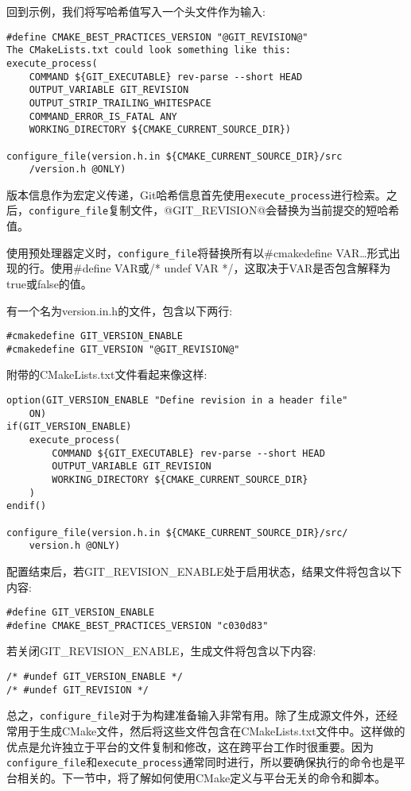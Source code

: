 回到示例，我们将写哈希值写入一个头文件作为输入:

\begin{lstlisting}[style=styleCMake]
#define CMAKE_BEST_PRACTICES_VERSION "@GIT_REVISION@"
The CMakeLists.txt could look something like this:
execute_process(
	COMMAND ${GIT_EXECUTABLE} rev-parse --short HEAD
	OUTPUT_VARIABLE GIT_REVISION
	OUTPUT_STRIP_TRAILING_WHITESPACE
	COMMAND_ERROR_IS_FATAL ANY
	WORKING_DIRECTORY ${CMAKE_CURRENT_SOURCE_DIR})

configure_file(version.h.in ${CMAKE_CURRENT_SOURCE_DIR}/src
	/version.h @ONLY)
\end{lstlisting}

版本信息作为宏定义传递，Git哈希信息首先使用\texttt{execute\_process}进行检索。之后，\texttt{configure\_file}复制文件，@GIT\_REVISION@会替换为当前提交的短哈希值。

使用预处理器定义时，\texttt{configure\_file}将替换所有以\#cmakedefine VAR…形式出现的行。使用\#define VAR或/* undef VAR */，这取决于VAR是否包含解释为true或false的值。

有一个名为version.in.h的文件，包含以下两行:

\begin{lstlisting}[style=styleCMake]
#cmakedefine GIT_VERSION_ENABLE
#cmakedefine GIT_VERSION "@GIT_REVISION@"
\end{lstlisting}

附带的CMakeLists.txt文件看起来像这样:

\begin{lstlisting}[style=styleCMake]
option(GIT_VERSION_ENABLE "Define revision in a header file"
	ON)
if(GIT_VERSION_ENABLE)
	execute_process(
		COMMAND ${GIT_EXECUTABLE} rev-parse --short HEAD
		OUTPUT_VARIABLE GIT_REVISION
		WORKING_DIRECTORY ${CMAKE_CURRENT_SOURCE_DIR}
	)
endif()

configure_file(version.h.in ${CMAKE_CURRENT_SOURCE_DIR}/src/
	version.h @ONLY)
\end{lstlisting}

配置结束后，若GIT\_REVISION\_ENABLE处于启用状态，结果文件将包含以下内容:

\begin{lstlisting}[style=styleCXX]
#define GIT_VERSION_ENABLE
#define CMAKE_BEST_PRACTICES_VERSION "c030d83"
\end{lstlisting}

若关闭GIT\_REVISION\_ENABLE，生成文件将包含以下内容:

\begin{lstlisting}[style=styleCXX]
/* #undef GIT_VERSION_ENABLE */
/* #undef GIT_REVISION */
\end{lstlisting}

总之，\texttt{configure\_file}对于为构建准备输入非常有用。除了生成源文件外，还经常用于生成CMake文件，然后将这些文件包含在CMakeLists.txt文件中。这样做的优点是允许独立于平台的文件复制和修改，这在跨平台工作时很重要。因为\texttt{configure\_file}和\texttt{execute\_process}通常同时进行，所以要确保执行的命令也是平台相关的。下一节中，将了解如何使用CMake定义与平台无关的命令和脚本。






















